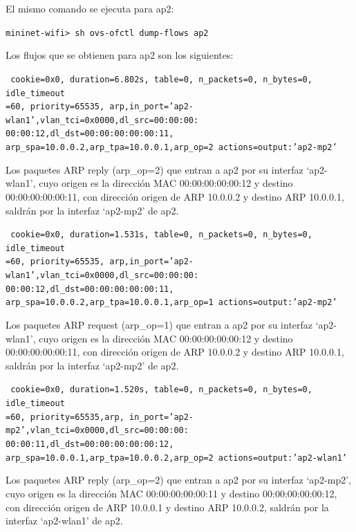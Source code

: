 \documentclass[a4paper,12pt,twoside,spanish]{book}
\begin{document}
El mismo comando se ejecuta para ap2:\par 

\begin{center}
	\texttt{mininet-wifi> sh ovs-ofctl dump-flows ap2}
\end{center}

Los flujos que se obtienen para ap2 son los siguientes:\par

\noindent\texttt{
	cookie=0x0, duration=6.802s, table=0, n\_packets=0, n\_bytes=0, idle\_timeout\\
	=60, priority=65535,
	arp,in\_port='ap2-wlan1',vlan\_tci=0x0000,dl\_src=00:00:00:\\
	00:00:12,dl\_dst=00:00:00:00:00:11,
	arp\_spa=10.0.0.2,arp\_tpa=10.0.0.1,arp\_op=2 actions=output:'ap2-mp2'
}

Los paquetes ARP reply (arp\_op=2) que entran a ap2 por su interfaz ‘ap2-wlan1’, cuyo origen es la dirección MAC 00:00:00:00:00:12 y destino 00:00:00:00:00:11, con dirección origen de ARP 10.0.0.2 y destino ARP 10.0.0.1, saldrán por la interfaz ‘ap2-mp2’ de ap2.\par 

\noindent\texttt{
	cookie=0x0, duration=1.531s, table=0, n\_packets=0, n\_bytes=0, idle\_timeout\\
	=60, priority=65535,
	arp,in\_port='ap2-wlan1',vlan\_tci=0x0000,dl\_src=00:00:00:\\
	00:00:12,dl\_dst=00:00:00:00:00:11,
	arp\_spa=10.0.0.2,arp\_tpa=10.0.0.1,arp\_op=1 actions=output:'ap2-mp2'
}

Los paquetes ARP request (arp\_op=1) que entran a ap2 por su interfaz ‘ap2-wlan1’, cuyo origen es la dirección MAC 00:00:00:00:00:12 y destino 00:00:00:00:00:11, con dirección origen de ARP 10.0.0.2 y destino ARP 10.0.0.1, saldrán por la interfaz ‘ap2-mp2’ de ap2.\par 

\noindent\texttt{
	cookie=0x0, duration=1.520s, table=0, n\_packets=0, n\_bytes=0, idle\_timeout\\
	=60, priority=65535,arp,
	in\_port='ap2-mp2',vlan\_tci=0x0000,dl\_src=00:00:00:\\
	00:00:11,dl\_dst=00:00:00:00:00:12,
	arp\_spa=10.0.0.1,arp\_tpa=10.0.0.2,arp\_op=2 actions=output:'ap2-wlan1'
}

Los paquetes ARP reply (arp\_op=2) que entran a ap2 por su interfaz ‘ap2-mp2’, cuyo origen es la dirección MAC 00:00:00:00:00:11 y destino 00:00:00:00:00:12, con dirección origen de ARP 10.0.0.1 y destino ARP 10.0.0.2, saldrán por la interfaz ‘ap2-wlan1’ de ap2.\par 
\end{document}
